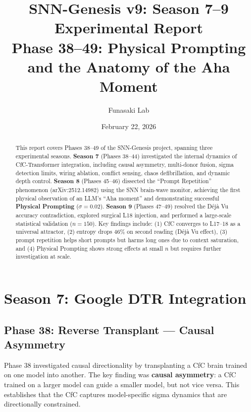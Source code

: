 \documentclass[11pt,a4paper]{article}
\title{\textbf{SNN-Genesis v9: Season 7--9 Experimental Report}\\[0.5em]
\large Phase 38--49: Physical Prompting and the Anatomy of the Aha Moment}
\author{Funasaki Lab}
\date{February 22, 2026}
\begin{document}
\maketitle
\thispagestyle{fancy}

\begin{abstract}
This report covers Phases 38--49 of the SNN-Genesis project, spanning three experimental seasons.
\textbf{Season 7} (Phases 38--44) investigated the internal dynamics of CfC-Transformer integration,
including causal asymmetry, multi-donor fusion, sigma detection limits, wiring ablation,
conflict sensing, chaos defibrillation, and dynamic depth control.
\textbf{Season 8} (Phases 45--46) dissected the ``Prompt Repetition'' phenomenon (arXiv:2512.14982)
using the SNN brain-wave monitor, achieving the first physical observation of an LLM's
``Aha moment'' and demonstrating successful \textbf{Physical Prompting} ($\sigma=0.02$).
\textbf{Season 9} (Phases 47--49) resolved the D\'{e}j\`{a} Vu accuracy contradiction,
explored surgical L18 injection, and performed a large-scale statistical validation ($n=150$).
Key findings include: (1) CfC converges to L17--18 as a universal attractor,
(2) entropy drops 46\% on second reading (D\'{e}j\`{a} Vu effect),
(3) prompt repetition helps short prompts but harms long ones due to context saturation,
and (4) Physical Prompting shows strong effects at small $n$ but requires further
investigation at scale.
\end{abstract}

\tableofcontents
\newpage

\section{Season 7: Google DTR Integration}

\subsection{Phase 38: Reverse Transplant --- Causal Asymmetry}

Phase 38 investigated causal directionality by transplanting a CfC brain
trained on one model into another. The key finding was \textbf{causal asymmetry}:
a CfC trained on a larger model can guide a smaller model, but not vice versa.
This establishes that the CfC captures model-specific sigma dynamics
that are directionally constrained.
\end{document}
